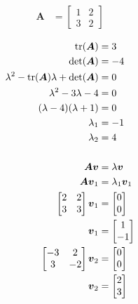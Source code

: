 \begin{align*}
    \boldsymbol{A} &= \begin{bmatrix}
        1 & 2 \\
        3 & 2
    \end{bmatrix}
\end{align*}

\begin{solution}
    \begin{align*}
        \operatorname{tr}(\boldsymbol{A}) &= 3 \\
        \det(\boldsymbol{A}) &= -4 \\
        \lambda^2 - \operatorname{tr}(\boldsymbol{A})\lambda + \det(\boldsymbol{A}) &= 0 \\
        \lambda^2 - 3\lambda - 4 &= 0 \\
        (\lambda - 4)(\lambda + 1) &= 0 \\
        \lambda_1 &= -1 \\
        \lambda_2 &= 4 \\
        \\
        \boldsymbol{Av} &= \lambda\boldsymbol{v} \\
        \boldsymbol{Av}_1 &= \lambda_1\boldsymbol{v}_1 \\
        \begin{bmatrix}
            2 & 2 \\
            3 & 3
        \end{bmatrix}\boldsymbol{v}_1 &= \begin{bmatrix}
            0 \\ 0
        \end{bmatrix} \\
        \boldsymbol{v}_1 &= \begin{bmatrix}
            1 \\ -1
        \end{bmatrix} \\
        \begin{bmatrix}
            -3 & 2 \\
            3 & -2
        \end{bmatrix}\boldsymbol{v}_2 &= \begin{bmatrix}
            0 \\ 0
        \end{bmatrix} \\
        \boldsymbol{v}_2 &= \begin{bmatrix}
            2 \\ 3
        \end{bmatrix}
    \end{align*}
\end{solution}
